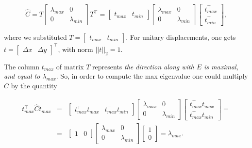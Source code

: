 \documentclass[10pt]{report}
\begin{document}
\[\hat{C} = T\begin{bmatrix}\lambda_{max} & 0 \\ 0 & \lambda_{min}\end{bmatrix}T^\top = \begin{bmatrix} t_{max} & t_{min}\end{bmatrix}\begin{bmatrix}\lambda_{max} & 0 \\ 0 & \lambda_{min}\end{bmatrix}\begin{bmatrix} t_{max}^\top \\ t_{min}^\top \end{bmatrix},\]

where we substituted
\(T = \begin{bmatrix} t_{max} & t_{min}\end{bmatrix}.\) For unitary
displacements, one gets
\(t = \begin{bmatrix} \Delta x & \Delta y \end{bmatrix}^\top\), with
norm \(||t||_ 2 = 1\).

The column \(t_{max}\) of matrix \(T\) represents \emph{the direction along
with \(E\) is maximal, and equal to \(\lambda_{max}\)}. So, in order to
compute the max eigenvalue one could multiply \(\hat{C}\) by the
quantity

\[\begin{array}{lll}t_{max}^\top \hat{C} t_{max} & = & \begin{bmatrix}t_{max}^\top t_{max} & t_{max}^\top t_{min}\end{bmatrix} \begin{bmatrix} \lambda_{max} & 0 \\ 0 & \lambda_{min}\end{bmatrix}\begin{bmatrix} t_{max}^\top t_{max} \\ t_{max}^\top t_{min}\end{bmatrix} = \\ & = & \begin{bmatrix}1 & 0\end{bmatrix} \begin{bmatrix} \lambda_{max} & 0 \\ 0 & \lambda_{min}\end{bmatrix}\begin{bmatrix} 1 \\ 0\end{bmatrix} = \lambda_{max}.\end{array}\]
\end{document}
